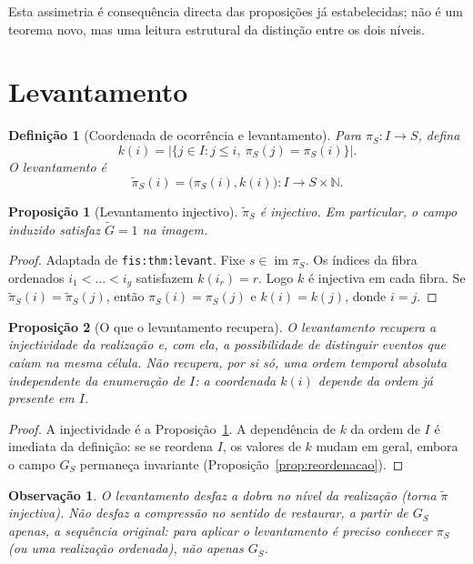 \documentclass[11pt,a4paper]{article}
\newtheorem{definicao}{Definição}
\newtheorem{proposicao}{Proposição}
\newtheorem{observacao}{Observação}
\begin{document}
Esta assimetria é consequência directa das proposições já estabelecidas; não é um teorema novo, mas uma leitura estrutural da distinção entre os dois níveis.

\section{Levantamento}

\begin{definicao}[Coordenada de ocorrência e levantamento]
Para \(\pi_S\colon I\to S\), defina
\[
k(i)=\lvert\{j\in I:j\le i,\ \pi_S(j)=\pi_S(i)\}\rvert.
\]
O levantamento é
\[
\widetilde\pi_S(i)=\bigl(\pi_S(i),k(i)\bigr)\colon I\to S\times\mathbb N.
\]
\end{definicao}

\begin{proposicao}[Levantamento injectivo]
\label{prop:levant}
\(\widetilde\pi_S\) é injectivo. Em particular, o campo induzido satisfaz \(\widetilde G=1\) na imagem.
\end{proposicao}

\begin{proof}
Adaptada de \texttt{fis:thm:levant}. Fixe \(s\in\operatorname{im}\pi_S\). Os índices da fibra ordenados \(i_1<\dots<i_g\) satisfazem \(k(i_r)=r\). Logo \(k\) é injectiva em cada fibra. Se \(\widetilde\pi_S(i)=\widetilde\pi_S(j)\), então \(\pi_S(i)=\pi_S(j)\) e \(k(i)=k(j)\), donde \(i=j\).
\end{proof}

\begin{proposicao}[O que o levantamento recupera]
O levantamento recupera a injectividade da realização e, com ela, a possibilidade de distinguir eventos que caíam na mesma célula. Não recupera, por si só, uma ordem temporal absoluta independente da enumeração de \(I\): a coordenada \(k(i)\) depende da ordem já presente em \(I\).
\end{proposicao}

\begin{proof}
A injectividade é a Proposição~\ref{prop:levant}. A dependência de \(k\) da ordem de \(I\) é imediata da definição: se se reordena \(I\), os valores de \(k\) mudam em geral, embora o campo \(G_S\) permaneça invariante (Proposição~\ref{prop:reordenacao}).
\end{proof}

\begin{observacao}
O levantamento desfaz a dobra no nível da realização (torna \(\widetilde\pi\) injectiva). Não desfaz a compressão no sentido de restaurar, a partir de \(G_S\) apenas, a sequência original: para aplicar o levantamento é preciso conhecer \(\pi_S\) (ou uma realização ordenada), não apenas \(G_S\).
\end{observacao}
\end{document}
